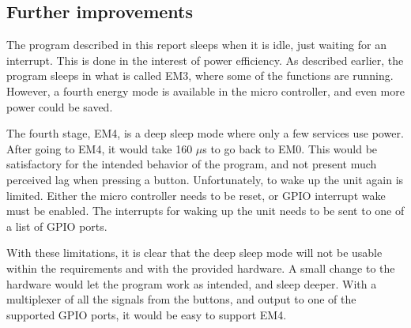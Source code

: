 \subsection{Further improvements}
The program described in this report sleeps when it is idle, just waiting for an interrupt.
This is done in the interest of power efficiency.
As described earlier, the program sleeps in what is called EM3, where some of the functions are running.
However, a fourth energy mode is available in the micro controller, and even more power could be saved.

The fourth stage, EM4, is a deep sleep mode where only a few services use power.
After going to EM4, it would take 160 $\mu$s to go back to EM0.
This would be satisfactory for the intended behavior of the program, and not present much perceived lag when pressing a button.
Unfortunately, to wake up the unit again is limited.
Either the micro controller needs to be reset, or GPIO interrupt wake must be enabled.
The interrupts for waking up the unit needs to be sent to one of a list of GPIO ports.\cite{referencemanual}

With these limitations, it is clear that the deep sleep mode will not be usable within the requirements and with the provided hardware.
A small change to the hardware would let the program work as intended, and sleep deeper.
With a multiplexer of all the signals from the buttons, and output to one of the supported GPIO ports, it would be easy to support EM4.
